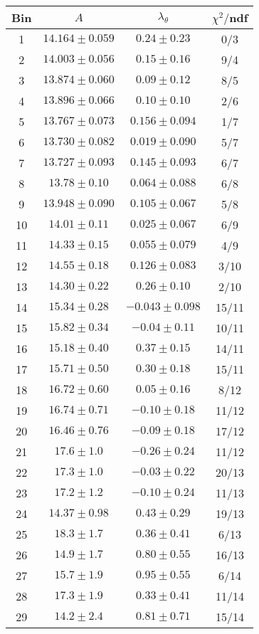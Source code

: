 \begin{tabular}{c|c|c|c}
Bin & $A$ & $\lambda_\theta$ & $\chi^2/$ndf \\
\hline
1 & $14.164\pm0.059$ & $0.24\pm0.23$ & 0/3 \\
2 & $14.003\pm0.056$ & $0.15\pm0.16$ & 9/4 \\
3 & $13.874\pm0.060$ & $0.09\pm0.12$ & 8/5 \\
4 & $13.896\pm0.066$ & $0.10\pm0.10$ & 2/6 \\
5 & $13.767\pm0.073$ & $0.156\pm0.094$ & 1/7 \\
6 & $13.730\pm0.082$ & $0.019\pm0.090$ & 5/7 \\
7 & $13.727\pm0.093$ & $0.145\pm0.093$ & 6/7 \\
8 & $13.78\pm0.10$ & $0.064\pm0.088$ & 6/8 \\
9 & $13.948\pm0.090$ & $0.105\pm0.067$ & 5/8 \\
10 & $14.01\pm0.11$ & $0.025\pm0.067$ & 6/9 \\
11 & $14.33\pm0.15$ & $0.055\pm0.079$ & 4/9 \\
12 & $14.55\pm0.18$ & $0.126\pm0.083$ & 3/10 \\
13 & $14.30\pm0.22$ & $0.26\pm0.10$ & 2/10 \\
14 & $15.34\pm0.28$ & $-0.043\pm0.098$ & 15/11 \\
15 & $15.82\pm0.34$ & $-0.04\pm0.11$ & 10/11 \\
16 & $15.18\pm0.40$ & $0.37\pm0.15$ & 14/11 \\
17 & $15.71\pm0.50$ & $0.30\pm0.18$ & 15/11 \\
18 & $16.72\pm0.60$ & $0.05\pm0.16$ & 8/12 \\
19 & $16.74\pm0.71$ & $-0.10\pm0.18$ & 11/12 \\
20 & $16.46\pm0.76$ & $-0.09\pm0.18$ & 17/12 \\
21 & $17.6\pm1.0$ & $-0.26\pm0.24$ & 11/12 \\
22 & $17.3\pm1.0$ & $-0.03\pm0.22$ & 20/13 \\
23 & $17.2\pm1.2$ & $-0.10\pm0.24$ & 11/13 \\
24 & $14.37\pm0.98$ & $0.43\pm0.29$ & 19/13 \\
25 & $18.3\pm1.7$ & $0.36\pm0.41$ & 6/13 \\
26 & $14.9\pm1.7$ & $0.80\pm0.55$ & 16/13 \\
27 & $15.7\pm1.9$ & $0.95\pm0.55$ & 6/14 \\
28 & $17.3\pm1.9$ & $0.33\pm0.41$ & 11/14 \\
29 & $14.2\pm2.4$ & $0.81\pm0.71$ & 15/14 \\
\end{tabular}
